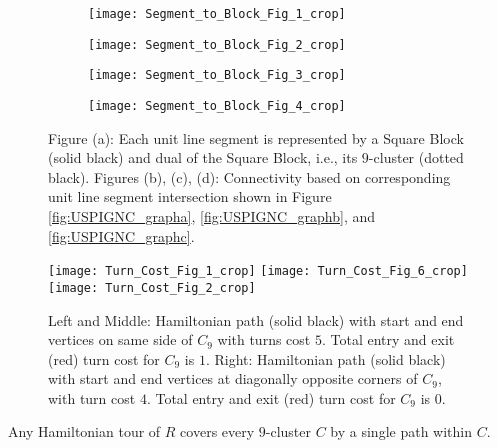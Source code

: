 \begin{figure}[htp!] 
  \centering
  \begin{subfigure}[t]{2.5in}
    \centering
    \texttt{[image: Segment\_to\_Block\_Fig\_1\_crop]}
    \caption{\label{fig:Segment_to_Blocka}}
  \end{subfigure}
  \begin{subfigure}[t]{2.5in}
    \centering
    \texttt{[image: Segment\_to\_Block\_Fig\_2\_crop]}
    \caption{\label{fig:Segment_to_Blockb}}
  \end{subfigure}	
  \begin{subfigure}[t]{2.5in}
    \centering
    \texttt{[image: Segment\_to\_Block\_Fig\_3\_crop]}
    \caption{\label{fig:Segment_to_Blockc}}
  \end{subfigure}
  \begin{subfigure}[t]{2.5in}
    \centering
    \texttt{[image: Segment\_to\_Block\_Fig\_4\_crop]}
    \caption{\label{fig:Segment_to_Blockd}}
  \end{subfigure}
  \caption{\label{fig:Segment_to_Block}
    Figure (a): Each unit line segment is represented by a Square Block (solid black) and dual of the Square Block, i.e., its $9$-cluster (dotted black).
    Figures (b), (c), (d): Connectivity based on corresponding unit line segment intersection shown in Figure \ref{fig:USPIGNC_grapha}, \ref{fig:USPIGNC_graphb}, and \ref{fig:USPIGNC_graphc}.
  }
\end{figure}


\begin{figure}[htp!] 
  \centering
  \texttt{[image: Turn\_Cost\_Fig\_1\_crop]}
  \hspace*{0.04in}
  \texttt{[image: Turn\_Cost\_Fig\_6\_crop]}
  \hspace*{0.04in}
  \texttt{[image: Turn\_Cost\_Fig\_2\_crop]}
  \caption{\label{fig:Turn_Cost}
    Left and Middle: Hamiltonian path (solid black) with start and end vertices on same side of $C_9$ with turns cost $5$.
    Total entry and exit (red) turn cost for $C_9$ is $1$.
    Right: Hamiltonian path (solid black) with start and end vertices at diagonally opposite corners of $C_9$, with turn cost $4$.
    Total entry and exit (red) turn cost for $C_9$ is $0$.
  }
\end{figure}

\begin{lem}\label{lem:sqblfirt}
  Any Hamiltonian tour of $R$ covers every $9$-cluster $C$ by a single path within $C$.  
\end{lem}

